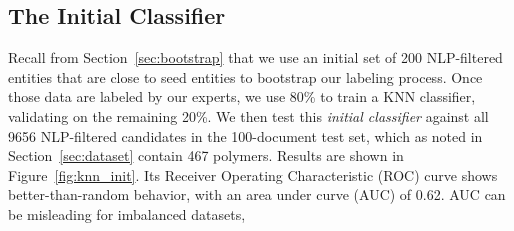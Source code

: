 \subsection{The Initial Classifier}
Recall from Section~\ref{sec:bootstrap} that we use an initial set of 200 NLP-filtered entities that are close
to seed entities to bootstrap our labeling process.
Once those data are labeled by our experts, 
we use 80\% to train a KNN classifier, validating on the remaining 20\%. 
We then test this \textit{initial classifier} against all \num{9656} NLP-filtered candidates in the 100-document test set,
which as noted in Section~\ref{sec:dataset} contain \num{467} polymers.
Results are shown in Figure~\ref{fig:knn_init}.
Its Receiver Operating Characteristic (ROC) curve
shows better-than-random behavior, with an area under curve (AUC) of 0.62. 
AUC can be misleading for imbalanced datasets, 
